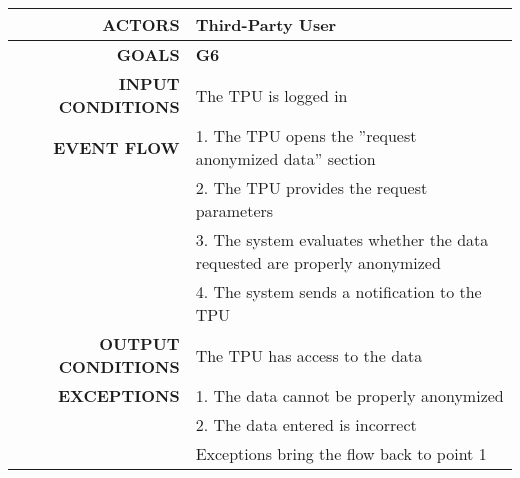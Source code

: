 \begin{table}[h!]
\begin{tabular}{|r|p{3in}|}
\hline
\textbf{ACTORS} & Third-Party User\\
\hline
\textbf{GOALS} & \textbf{G6}\\
\hline
\textbf{INPUT CONDITIONS} & The TPU is logged in\\
\hline
\textbf{EVENT FLOW} 
&1. The TPU opens the ''request anonymized data'' section \\
&2. The TPU provides the request parameters \\
&3. The system evaluates whether the data requested are properly anonymized\\
&4. The system sends a notification to the TPU \\
\hline
\textbf{OUTPUT CONDITIONS} & The TPU has access to the data \\
\hline
\textbf{EXCEPTIONS} 
&1. The data cannot be properly anonymized \\
&2. The data entered is incorrect\\
&Exceptions bring the flow back to point 1 \\
\hline
\end{tabular}
\end{table}